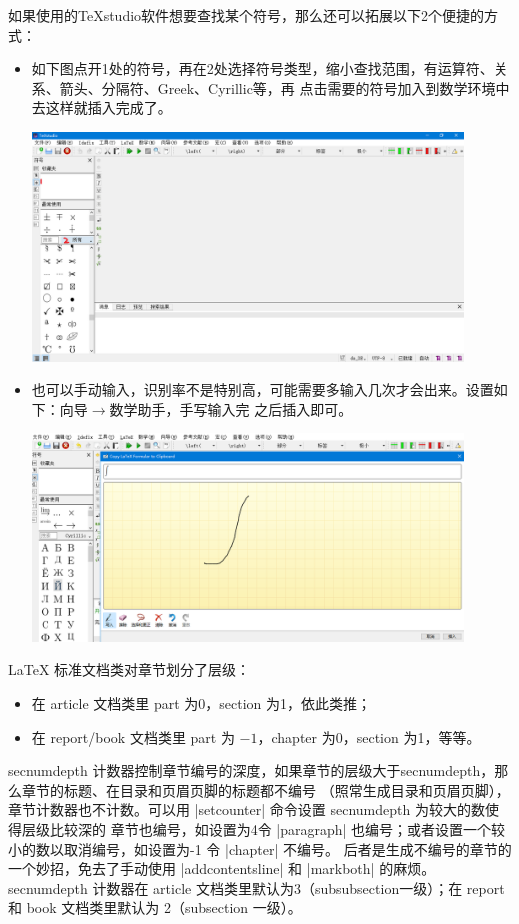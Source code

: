 如果使用的TeXstudio软件想要查找某个符号，那么还可以拓展以下2个便捷的方式：
\begin{itemize}
  \item 如下图点开1处的符号，再在2处选择符号类型，缩小查找范围，有运算符、关系、箭头、分隔符、Greek、Cyrillic等，再
  点击需要的符号加入到数学环境中去这样就插入完成了。

  \includegraphics[width=0.9\textwidth]{include/images/5.png}
  \item 也可以手动输入，识别率不是特别高，可能需要多输入几次才会出来。设置如下：向导$\rightarrow$数学助手，手写输入完
  之后插入即可。

  \includegraphics[width=0.9\textwidth]{include/images/image.png}
\end{itemize}





\LaTeX{} 标准文档类对章节划分了层级：
\begin{itemize}
  \item 在 article 文档类里 part 为0，section 为1，依此类推；
  \item 在 report/book 文档类里 part 为 $-1$，chapter 为0，section 为1，等等。
\end{itemize}

secnumdepth 计数器控制章节编号的深度，如果章节的层级大于secnumdepth，那么章节的标题、在目录和页眉页脚的标题都不编号
（照常生成目录和页眉页脚），章节计数器也不计数。可以用 |setcounter| 命令设置 secnumdepth 为较大的数使得层级比较深的
章节也编号，如设置为4令 |paragraph| 也编号；或者设置一个较小的数以取消编号，如设置为-1 令 |chapter| 不编号。
后者是生成不编号的章节的一个妙招，免去了手动使用 |addcontentsline| 和 |markboth| 的麻烦。
secnumdepth 计数器在 article 文档类里默认为3（subsubsection一级）；在 report 和 book 文档类里默认为
2（subsection 一级）。

